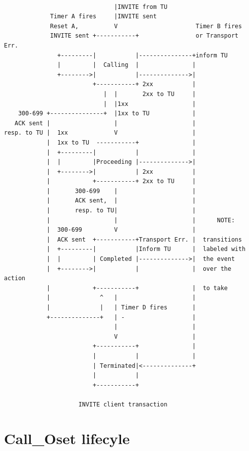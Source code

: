 \documentclass[a4paper]{report}
\begin{document}
\pagebreak
\begin{verbatim}

                               |INVITE from TU
             Timer A fires     |INVITE sent
             Reset A,          V                      Timer B fires
             INVITE sent +-----------+                or Transport Err.
               +---------|           |---------------+inform TU
               |         |  Calling  |               |
               +-------->|           |-------------->|
                         +-----------+ 2xx           |
                            |  |       2xx to TU     |
                            |  |1xx                  |
    300-699 +---------------+  |1xx to TU            |
   ACK sent |                  |                     |
resp. to TU |  1xx             V                     |
            |  1xx to TU  -----------+               |
            |  +---------|           |               |
            |  |         |Proceeding |-------------->|
            |  +-------->|           | 2xx           |
            |            +-----------+ 2xx to TU     |
            |       300-699    |                     |
            |       ACK sent,  |                     |
            |       resp. to TU|                     |
            |                  |                     |      NOTE:
            |  300-699         V                     |
            |  ACK sent  +-----------+Transport Err. |  transitions
            |  +---------|           |Inform TU      |  labeled with
            |  |         | Completed |-------------->|  the event
            |  +-------->|           |               |  over the action
            |            +-----------+               |  to take
            |              ^   |                     |
            |              |   | Timer D fires       |
            +--------------+   | -                   |
                               |                     |
                               V                     |
                         +-----------+               |
                         |           |               |
                         | Terminated|<--------------+
                         |           |
                         +-----------+

                     INVITE client transaction

\end{verbatim}


\section{Call\_Oset lifecyle}
\end{document}
